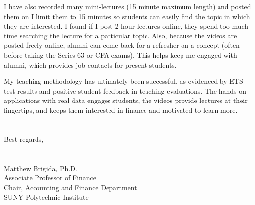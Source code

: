 \documentclass[12pt]{article}
\begin{document}
I have also recorded many mini-lectures (15 minute maximum length) and posted them on \href{https://www.youtube.com/channel/UCwekb0vAK-FKaqPF5gfd0eQ}{\color{Blue}{my YouTube channel.}} I limit them to 15 minutes so students can easily find the topic in which they are interested.  I found if I post 2 hour lectures online, they spend too much time searching the lecture for a particular topic.  Also, because the videos are posted freely online, alumni can come back for a refresher on a concept (often before taking the Series 63 or CFA exams).  This helps keep me engaged with alumni, which provides job contacts for present students.  

My teaching methodology has ultimately been successful, as evidenced by ETS test results and positive student feedback in teaching evaluations.  The hands-on applications with real data engages students, the videos provide lectures at their fingertips, and keeps them interested in finance and motivated to learn more. \\
\\
\\
Best regards,\\
\\
\\
Matthew Brigida, Ph.D.\\
Associate Professor of Finance\\
Chair, Accounting and Finance Department \\
SUNY Polytechnic Institute
\end{document}
